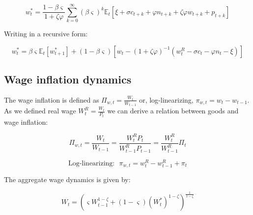 \documentclass{article}
\newcommand{\Et}{\mathbb{E}_t}
\begin{document}
\begin{equation}
    w_t^* = \frac{1-\beta \varsigma}{1 + \zeta \varphi} \sum^{\infty}_{k=0} (\beta \varsigma)^k \Et[\xi + \sigma c_{t+k} + \varphi n_{t+k} + \zeta \varphi w_{t+k} + p_{t+k}]
\end{equation}

\begin{minipage}{0.3\textwidth}
    Writing in a recursive form:
\end{minipage} 
\begin{minipage}{0.69\textwidth}
    \begin{equation}
        \label{opt_wage}
        w_t^* = \beta \varsigma \Et[w^*_{t+1}] + (1 - \beta \varsigma) \left[w_t - (1+\zeta \varphi)^{-1} (w_t^R  - \sigma c_t - \varphi n_t - \xi) \right]
    \end{equation}
\end{minipage} 

\subsection{Wage inflation dynamics}
The wage inflation is defined as $\Pi_{w,t} = \frac{W_t}{W_{t-1}}$ or, log-linearizing, $\pi_{w,t} = w_t - w_{t-1}$. As we defined real wage $W_t^R = \frac{W_t}{P_t}$ we can derive a relation between goods and wage inflation:

\vspace{6pt}

\begin{minipage}{0.5\textwidth}
    \begin{equation}
        \Pi_{w,t} = \frac{W_t}{W_{t-1}} = \frac{W_t^R P_t}{W_{t-1}^R P_{t-1}} = \frac{W_t^R}{W_{t-1}^R}\Pi_t
    \end{equation}
\end{minipage} 
\begin{minipage}{0.49\textwidth}
    \begin{equation}
        \label{wage_inflation}
        \textrm{Log-linearizing:} \ \ \ \pi_{w,t} = w_t^R - w_{t-1}^R + \pi_t
    \end{equation}
\end{minipage} 

\begin{minipage}{0.5\textwidth}
    The aggregate wage dynamics is given by:
\end{minipage} 
\begin{minipage}{0.49\textwidth}
    \begin{equation}
        W_t = \left(\varsigma W_{t-1}^{1-\zeta} + (1-\varsigma) (W_t^*)^{1-\zeta} \right)^{\frac{1}{1-\zeta}}
    \end{equation}
\end{minipage} 
\end{document}
